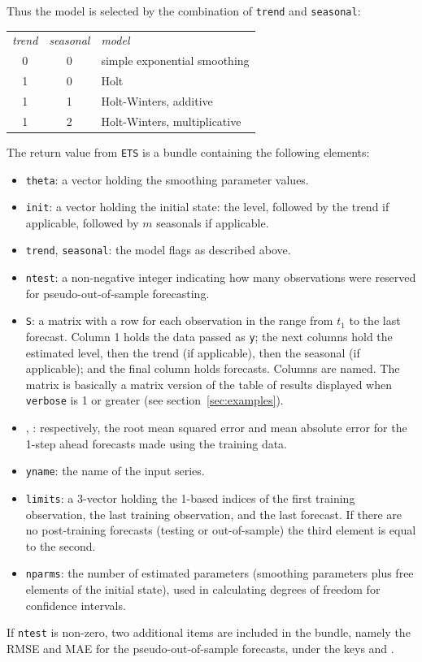 \documentclass{article}
\begin{document}
Thus the model is selected by the combination of \texttt{trend} and
\texttt{seasonal}:
\begin{center}
  \begin{tabular}{ccl}
    \textit{trend} & \textit{seasonal} & \textit{model} \\[3pt]
    0 & 0 & simple exponential smoothing \\
    1 & 0 & Holt \\
    1 & 1 & Holt-Winters, additive \\
    1 & 2 & Holt-Winters, multiplicative
  \end{tabular}
\end{center}

The return value from \texttt{ETS} is a bundle containing the
following elements:
\begin{itemize}
\item \texttt{theta}: a vector holding the smoothing parameter values.
\item \texttt{init}: a vector holding the initial state: the level,
  followed by the trend if applicable, followed by $m$ seasonals if
  applicable.
\item \texttt{trend}, \texttt{seasonal}: the model flags as described
  above.
\item \texttt{ntest}: a non-negative integer indicating how many
  observations were reserved for pseudo-out-of-sample forecasting.
\item \texttt{S}: a matrix with a row for each observation in the range
  from $t_1$ to the last forecast. Column 1 holds the data passed as
  \texttt{y}; the next columns hold the estimated level, then the trend
  (if applicable), then the seasonal (if applicable); and the final
  column holds forecasts. Columns are named. The matrix is basically a
  matrix version of the table of results displayed when \texttt{verbose}
  is 1 or greater (see section~\ref{sec:examples}).
\item {}, : respectively, the root mean
  squared error and mean absolute error for the 1-step ahead forecasts
  made using the training data.
\item \texttt{yname}: the name of the input series.
\item \texttt{limits}: a 3-vector holding the 1-based indices of the
  first training observation, the last training observation, and the
  last forecast. If there are no post-training forecasts (testing or
  out-of-sample) the third element is equal to the second.
\item \texttt{nparms}: the number of estimated parameters (smoothing
  parameters plus free elements of the initial state), used in
  calculating degrees of freedom for confidence intervals.
\end{itemize}
If \texttt{ntest} is non-zero, two additional items are included in the
bundle, namely the RMSE and MAE for the pseudo-out-of-sample forecasts,
under the keys  and .
\end{document}
